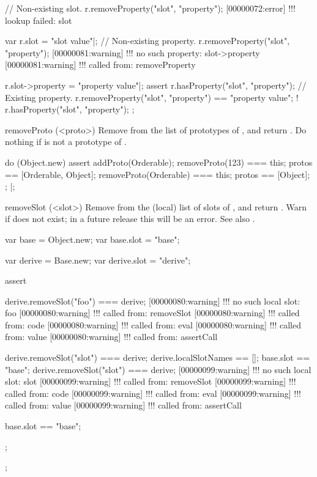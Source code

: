 \begin{urbiscriptapi}
\begin{urbiscript}
// Non-existing slot.
r.removeProperty("slot", "property");
[00000072:error] !!! lookup failed: slot

var r.slot = "slot value"|;
// Non-existing property.
r.removeProperty("slot", "property");
[00000081:warning] !!! no such property: slot->property
[00000081:warning] !!!    called from: removeProperty

r.slot->property = "property value"|;
assert
{
  r.hasProperty("slot", "property");
  // Existing property.
  r.removeProperty("slot", "property") == "property value";
  ! r.hasProperty("slot", "property");
};
\end{urbiscript}

\item[removeProto](<proto>)%
  Remove  from the list of prototypes of \this, and return \this.
  Do nothing if  is not a prototype of \this.
\begin{urbiscript}
do (Object.new)
{
  assert
  {
    addProto(Orderable);
    removeProto(123) === this;
    protos == [Orderable, Object];
    removeProto(Orderable) === this;
    protos == [Object];
  };
}|;
\end{urbiscript}

\item[removeSlot](<slot>)%
  Remove  from the (local) list of slots of \this, and return
  \this.  Warn if  does not exist; in a future release this will
  be an error.  See also .
\begin{urbiscript}
{
  var base = Object.new;
  var base.slot = "base";

  var derive = Base.new;
  var derive.slot = "derive";

  assert
  {
    derive.removeSlot("foo") === derive;
[00000080:warning] !!! no such local slot: foo
[00000080:warning] !!!    called from: removeSlot
[00000080:warning] !!!    called from: code
[00000080:warning] !!!    called from: eval
[00000080:warning] !!!    called from: value
[00000080:warning] !!!    called from: assertCall

    derive.removeSlot("slot") === derive;
    derive.localSlotNames == [];
    base.slot == "base";
    derive.removeSlot("slot") === derive;
[00000099:warning] !!! no such local slot: slot
[00000099:warning] !!!    called from: removeSlot
[00000099:warning] !!!    called from: code
[00000099:warning] !!!    called from: eval
[00000099:warning] !!!    called from: value
[00000099:warning] !!!    called from: assertCall

    base.slot == "base";
  };
};
\end{urbiscript}



\end{urbiscriptapi}
